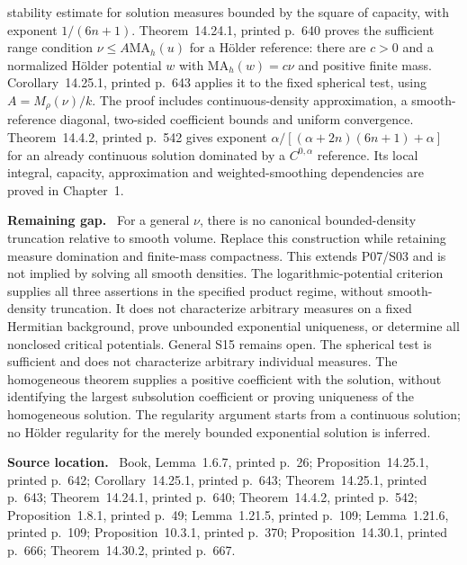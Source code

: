 \documentclass[11pt]{article}
\newcommand{\field}[1]{\par\medskip\noindent\textbf{#1.}\ }
\begin{document}
stability estimate for solution measures bounded by the square of capacity, with exponent $1/(6n+1)$. Theorem~14.24.1, printed p.~640 proves the sufficient range condition $\nu\leq A\mathrm{MA}_h(u)$ for a H\"older reference: there are $c>0$ and a normalized H\"older potential $w$ with $\mathrm{MA}_h(w)=c\nu$ and positive finite mass. Corollary~14.25.1, printed p.~643 applies it to the fixed spherical test, using $A=M_\rho(\nu)/k$. The proof includes continuous-density approximation, a smooth-reference diagonal, two-sided coefficient bounds and uniform convergence. Theorem~14.4.2, printed p.~542 gives exponent $\alpha/[(\alpha+2n)(6n+1)+\alpha]$ for an already continuous solution dominated by a $C^{0,\alpha}$ reference. Its local integral, capacity, approximation and weighted-smoothing dependencies are proved in Chapter~1.
\field{Remaining gap} For a general $\nu$, there is no canonical bounded-density truncation relative to smooth volume. Replace this construction while retaining measure domination and finite-mass compactness. This extends P07/S03 and is not implied by solving all smooth densities. The logarithmic-potential criterion supplies all three assertions in the specified product regime, without smooth-density truncation. It does not characterize arbitrary measures on a fixed Hermitian background, prove unbounded exponential uniqueness, or determine all nonclosed critical potentials. General S15 remains open. The spherical test is sufficient and does not characterize arbitrary individual measures.  The homogeneous theorem supplies a positive coefficient with the solution, without identifying the largest subsolution coefficient or proving uniqueness of the homogeneous solution. The regularity argument starts from a continuous solution; no H\"older regularity for the merely bounded exponential solution is inferred.
\field{Source location} Book, Lemma~1.6.7, printed p.~26; Proposition~14.25.1, printed p.~642; Corollary~14.25.1, printed p.~643; Theorem~14.25.1, printed p.~643; Theorem~14.24.1, printed p.~640; Theorem~14.4.2, printed p.~542; Proposition~1.8.1, printed p.~49; Lemma~1.21.5, printed p.~109; Lemma~1.21.6, printed p.~109; Proposition~10.3.1, printed p.~370; Proposition~14.30.1, printed p.~666; Theorem~14.30.2, printed p.~667.
\end{document}
